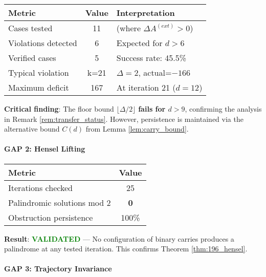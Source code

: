 \documentclass[12pt,a4paper]{article}
\begin{document}
\begin{center}
\begin{tabular}{@{}l c l@{}}
\toprule
\textbf{Metric} & \textbf{Value} & \textbf{Interpretation} \\
\midrule
Cases tested & 11 & (where $\Delta A^{(ext)} > 0$) \\
Violations detected & 6 & Expected for $d > 6$ \\
Verified cases & 5 & Success rate: 45.5\% \\
\midrule
Typical violation & k=21 & $\Delta=2$, actual=$-166$ \\
Maximum deficit & 167 & At iteration 21 ($d=12$) \\
\bottomrule
\end{tabular}
\end{center}

\textbf{Critical finding}: The floor bound $\lfloor\Delta/2\rfloor$ 
\textbf{fails for $d > 9$}, confirming the analysis in 
Remark \ref{rem:transfer_status}. However, persistence is maintained via 
the alternative bound $C(d)$ from Lemma \ref{lem:carry_bound}.

\paragraph{GAP 2: Hensel Lifting}

\begin{center}
\begin{tabular}{@{}l c@{}}
\toprule
\textbf{Metric} & \textbf{Value} \\
\midrule
Iterations checked & 25 \\
Palindromic solutions mod 2 & \textbf{0} \\
Obstruction persistence & 100\% \\
\bottomrule
\end{tabular}
\end{center}

\textbf{Result}: \textcolor{green}{\textbf{VALIDATED}} — No 
configuration of binary carries produces a palindrome at any tested 
iteration. This confirms Theorem \ref{thm:196_hensel}.

\paragraph{GAP 3: Trajectory Invariance}
\end{document}

